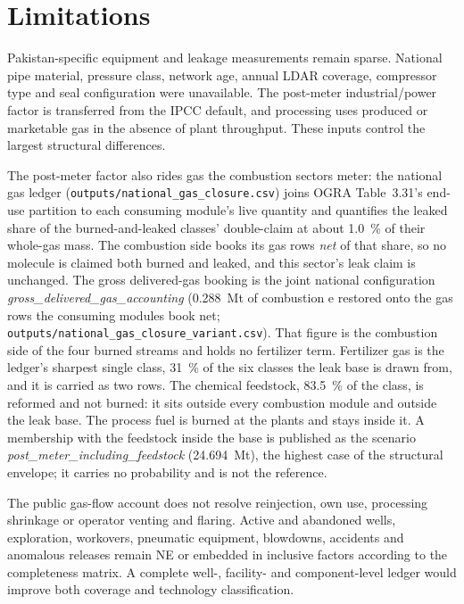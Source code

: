 \section{Limitations}
\label{sec:limitations}

Pakistan-specific equipment and leakage measurements remain sparse. National pipe material,
pressure class, network age, annual LDAR coverage, compressor type and seal configuration were
unavailable. The post-meter industrial/power factor is transferred from the IPCC default, and
processing uses produced or marketable gas in the absence of plant throughput. These inputs
control the largest structural differences.

The post-meter factor also rides gas the combustion sectors meter: the national
gas ledger (\texttt{outputs/national\_gas\_closure.csv}) joins OGRA Table~3.31's end-use
partition to each consuming module's live quantity and quantifies the leaked share of
the burned-and-leaked classes' double-claim at about \SI{1.0}{\percent} of their
whole-gas mass. The combustion side books its gas rows \emph{net}
of that share, so no molecule is claimed both burned and leaked, and this sector's leak claim
is unchanged. The gross delivered-gas booking is the joint national configuration
\emph{gross\_delivered\_gas\_accounting}
(\SI{+0.288}{\mega\tonne} of combustion \COtwo{}e restored onto the gas rows the
consuming modules book net; \texttt{outputs/national\_gas\_closure\_variant.csv}). That figure is the combustion side of the four burned streams
and holds no fertilizer term. Fertilizer gas is the ledger's sharpest single class,
\SI{31}{\percent} of the six classes the leak base is drawn from, and it is carried as two
rows. The chemical feedstock, \SI{83.5}{\percent} of the class, is reformed and not burned:
it sits outside every combustion module and outside the leak base. The
process fuel is burned at the plants and stays inside it. A membership with the
feedstock inside the base is published as the scenario
\emph{post\_meter\_including\_feedstock} (\SI{24.694}{\mega\tonne}), the highest case of the
structural envelope; it carries no probability and is not the reference.

The public gas-flow account does not resolve reinjection, own use, processing shrinkage or
operator venting and flaring. Active and abandoned wells, exploration, workovers, pneumatic
equipment, blowdowns, accidents and anomalous releases remain NE or embedded in inclusive
factors according to the completeness matrix. A complete well-, facility- and component-level
ledger would improve both coverage and technology classification.

